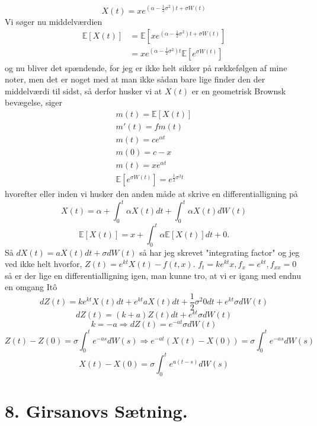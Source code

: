 \documentclass[12pt]{report}
\theoremstyle{break}
\theoremstyle{break}
\newcommand{\EE}{\mathbb{E}}
\newcommand{\1}{\mathds{1}}
\begin{document}
\[ X(t)=xe^{\left(\alpha-\frac{1}{2}\sigma^2\right)t+\sigma W(t)} \]
Vi søger nu middelværdien
\begin{align*}
	\EE\left[X(t)\right]&=\EE\left[ xe^{\left(\alpha-\frac{1}{2}\sigma^2\right)t+\sigma W(t)} \right]\\
	&=xe^{\left(\alpha-\frac{1}{2}\sigma^2\right)t}\EE\left[ e^{\sigma W(t)} \right]
\end{align*}
og nu bliver det spændende, for jeg er ikke helt sikker på rækkefølgen af mine noter, men det er noget med at man ikke sådan bare lige finder den der middelværdi til sidst, så derfor husker vi at $X(t)$ er en geometrisk Brownsk bevægelse, siger
\begin{align*}
	m(t)=\EE[X(t)]\\
	m'(t)=fm(t)\\
	m(t)=ce^{\alpha t}\\
	m(0)=c-x\\
	m(t)=xe^{\alpha t}\\
	\EE\left[ e^{\sigma W(t)} \right]=e^{\frac{1}{2}\sigma^2 t}
\end{align*}
hvorefter eller inden vi husker den anden måde at skrive en differentialligning på
\[ X(t)=\alpha +\int_{0}^{t}\alpha X(t) dt+ \int_{0}^{t}\alpha  X(t)dW(t)\]
\[ \EE\left[ X(t) \right]=x+\int_{0}^{t}\alpha\EE\left[ X(t) \right]dt+0. \]
Så $dX(t)=aX(t)dt+\sigma dW(t)$ så har jeg skrevet "integrating factor" og jeg ved ikke helt hvorfor, $Z(t)=e^{kt}X(t)-f(t,x)$. $f_t=ke^{kt}x, f_x=e^{kt},f_{xx}=0$ så er der lige en differentialligning igen, man kunne tro, at vi er igang med endnu en omgang Itô
\[ dZ(t)=ke^{kt}X(t)dt+e^{kt}aX(t)dt+\frac{1}{2}\sigma^2 0dt+e^{kt}\sigma dW(t) \]
\[ dZ(t)=(k+a)Z(t)dt+e^{kt}\sigma dW(t) \]
\[ k=-a\Rightarrow dZ(t)=e^{-at}\sigma dW(t) \]
\[ Z(t)-Z(0)=\sigma\int_{0}^{t}e^{-as}dW(s)\Rightarrow e^{-at}(X(t)-X(0)) = \sigma\int_{0}^{t}e^{-as}dW(s) \]
\[ X(t)-X(0)=\sigma\int_{0}^{t}e^{a(t-s)}dW(s) \]

\newpage

\section*{8. Girsanovs Sætning.}
\end{document}
